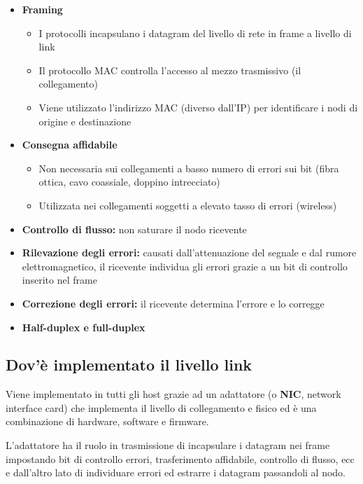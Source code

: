 \documentclass{report}
\begin{document}
\begin{itemize}
\item
  \textbf{Framing}

  \begin{itemize}
  \item
    I protocolli incapsulano i datagram del livello di rete in frame a
    livello di link
  \item
    Il protocollo MAC controlla l'accesso al mezzo trasmissivo (il
    collegamento)
  \item
    Viene utilizzato l'indirizzo MAC (diverso dall'IP) per identificare
    i nodi di origine e destinazione
  \end{itemize}
\item
  \textbf{Consegna affidabile}

  \begin{itemize}
  \item
    Non necessaria sui collegamenti a basso numero di errori sui bit
    (fibra ottica, cavo coassiale, doppino intrecciato)
  \item
    Utilizzata nei collegamenti soggetti a elevato tasso di errori
    (wireless)
  \end{itemize}
\item
  \textbf{Controllo di flusso:} non saturare il nodo ricevente
\item
  \textbf{Rilevazione degli errori:} causati dall'attenuazione del
  segnale e dal rumore elettromagnetico, il ricevente individua gli
  errori grazie a un bit di controllo inserito nel frame
\item
  \textbf{Correzione degli errori:} il ricevente determina l'errore e lo
  corregge
\item
  \textbf{Half-duplex e full-duplex}
\end{itemize}

\hypertarget{header-n30}{%
\subsection{Dov'è implementato il livello link}\label{header-n30}}

Viene implementato in tutti gli host grazie ad un adattatore (o
\textbf{NIC}, network interface card) che implementa il livello di
collegamento e fisico ed è una combinazione di hardware, software e
firmware.

L'adattatore ha il ruolo in trasmissione di incapsulare i datagram nei
frame impostando bit di controllo errori, trasferimento affidabile,
controllo di flusso, ecc e dall'altro lato di individuare errori ed
estrarre i datagram passandoli al nodo.
\end{document}
